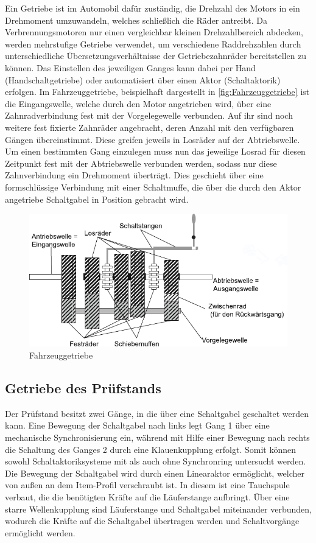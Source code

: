 Ein Getriebe ist im Automobil dafür zuständig, die Drehzahl des Motors in ein Drehmoment umzuwandeln, welches schließlich die Räder antreibt.
Da Verbrennungsmotoren nur einen vergleichbar kleinen Drehzahlbereich abdecken, werden mehrstufige Getriebe verwendet, um verschiedene Raddrehzahlen durch unterschiedliche Übersetzungsverhältnisse der Getriebezahnräder bereitstellen zu können.  Das Einstellen des jeweiligen Ganges kann dabei per Hand (Handschaltgetriebe) oder automatisiert über einen Aktor (Schaltaktorik) erfolgen. 
Im Fahrzeuggetriebe, beispielhaft dargestellt in \autoref{fig:Fahrzeuggetriebe} ist die Eingangswelle, welche durch den Motor angetrieben wird, über eine Zahnradverbindung  fest mit der  Vorgelegewelle verbunden. Auf ihr sind noch weitere fest fixierte Zahnräder angebracht, deren Anzahl mit den verfügbaren Gängen übereinstimmt. Diese greifen jeweils in Losräder auf der Abtriebswelle. Um einen bestimmten Gang einzulegen muss nun das jeweilige Losrad für diesen Zeitpunkt fest mit der Abtriebswelle verbunden werden, sodass nur diese Zahnverbindung ein Drehmoment überträgt. Dies geschieht über eine formschlüssige Verbindung mit einer Schaltmuffe, die über die durch den Aktor angetriebe Schaltgabel in Position gebracht wird.

\begin{figure}[h]
	\centering
		\includegraphics{Bilder/Fahrzeuggetriebe.pdf}
	\caption{Fahrzeuggetriebe \cite[S.17]{Hilgers2016}}
	\label{fig:Fahrzeuggetriebe}
\end{figure} \noindent

\subsection{Getriebe des Prüfstands}

Der Prüfstand besitzt zwei Gänge, in die über eine Schaltgabel geschaltet werden kann. Eine Bewegung der Schaltgabel nach links legt Gang 1 über eine mechanische Synchronisierung ein, während mit Hilfe einer Bewegung nach rechts die Schaltung des Ganges 2 durch eine Klauenkupplung erfolgt. Somit können sowohl Schaltaktoriksysteme mit als auch ohne Synchronring untersucht werden.
Die Bewegung der Schaltgabel wird durch einen Linearaktor ermöglicht, welcher von außen an dem Item-Profil verschraubt ist. In diesem ist eine Tauchspule verbaut, die die benötigten Kräfte auf die Läuferstange aufbringt. Über eine starre Wellenkupplung sind Läuferstange und Schaltgabel miteinander verbunden, wodurch die Kräfte auf die Schaltgabel übertragen werden und Schaltvorgänge ermöglicht werden.

